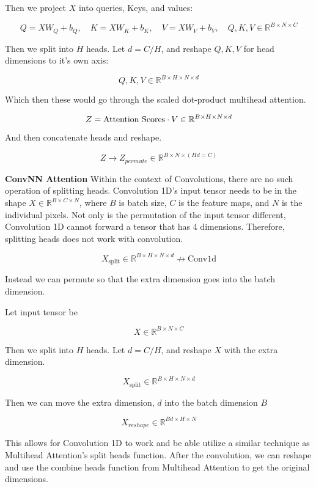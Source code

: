 \documentclass{article}
\begin{document}
Then we project $X$ into queries, Keys, and values: 

\[
Q = XW_Q + b_Q, \quad K = XW_K+b_K, \quad V = XW_V + b_V, \quad Q, K, V \in \mathbb{R}^{B \times N \times C}
\]

Then we split into $H$ heads. Let \(d = C/H\), and reshape $Q, K, V$ for head dimensions to it's own axis: 

\[
Q, K, V \in \mathbb{R}^{B \times H \times N \times d}
\]

Which then these would go through the scaled dot-product multihead attention. 

\[
Z = \text{Attention Scores} \space \cdot V \in \mathbb{R}^{B \times H \times N \times d}
\]


And then concatenate heads and reshape. 

\[
Z \rightarrow{} Z_{permute} \in \mathbb{R}^{B \times N \times (Hd = C)}
\]



\textbf{ConvNN Attention}
Within the context of Convolutions, there are no such operation of splitting heads. Convolution 1D's input tensor needs to be in the shape \(X \in \mathbb{R}^{B \times C \times N}\), where $B$ is batch size, $C$ is the feature maps, and $N$ is the individual pixels. Not only is the permutation of the input tensor different, Convolution 1D cannot forward a tensor that has 4 dimensions. Therefore, splitting heads does not work with convolution. 

\[
X_{\text{split}} \in \mathbb{R}^{B \times H \times N \times d} \nrightarrow \text{Conv1d}
\]

Instead we can permute so that the extra dimension goes into the batch dimension. 

Let input tensor be 

\[
X \in \mathbb{R}^{B \times N \times C}
\]

Then we split into $H$ heads. Let \(d = C/H\), and reshape $X$ with the extra dimension. 

\[
X_{\text{split}} \in \mathbb{R}^{B \times H \times N \times d}
\]

Then we can move the extra dimension, $d$ into the batch dimension $B$

\[
X_{reshape} \in \mathbb{R}^{Bd \times H \times N}
\]

This allows for Convolution 1D to work and be able utilize a similar technique as Multihead Attention's split heads function. After the convolution, we can reshape and use the combine heads function from Multihead Attention to get the original dimensions. 
\end{document}

